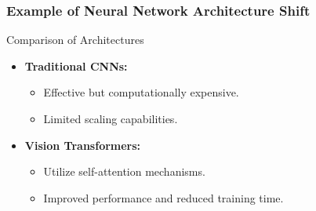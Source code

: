 \documentclass{beamer}
\begin{document}
\begin{frame}[fragile]
    \frametitle{Example of Neural Network Architecture Shift}
    \begin{block}{Comparison of Architectures}
        \begin{itemize}
            \item \textbf{Traditional CNNs:}
            \begin{itemize}
                \item Effective but computationally expensive.
                \item Limited scaling capabilities.
            \end{itemize}
            \item \textbf{Vision Transformers:}
            \begin{itemize}
                \item Utilize self-attention mechanisms.
                \item Improved performance and reduced training time.
            \end{itemize}
        \end{itemize}
    \end{block}
\end{frame}
\end{document}
